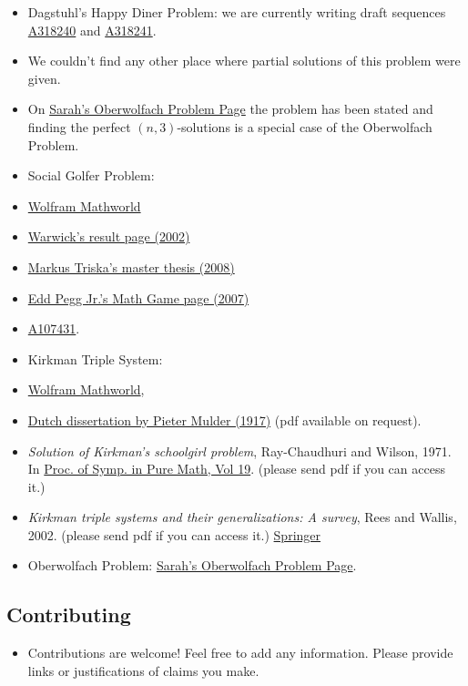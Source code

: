 \documentclass[a4paper]{article}
\begin{document}
\begin{itemize}

\item
  Dagstuhl's Happy Diner Problem: we are currently writing draft
  sequences \href{https://oeis.org/draft/A318240}{A318240} and
  \href{https://oeis.org/draft/A318241}{A318241}.
\item
  We couldn't find any other place where partial solutions of this
  problem were given.
\item
  On
  \href{http://facultyweb.kennesaw.edu/shollid4/oberwolfach.php}{Sarah's
  Oberwolfach Problem Page} the problem has been stated and finding the
  perfect $(n,3)$-solutions is a special case of the Oberwolfach
  Problem.
\item
  Social Golfer Problem:
\item
  \href{http://mathworld.wolfram.com/SocialGolferProblem.html}{Wolfram
  Mathworld}
\item
  \href{http://web.archive.org/web/20050308115423/http://www.icparc.ic.ac.uk/~wh/golf/}{Warwick's
  result page (2002)}
\item
  \href{https://www.metalevel.at/sgp/}{Markus Triska's master thesis
  (2008)}
\item
  \href{http://www.mathpuzzle.com/MAA/54-Golf\%20Tournaments/mathgames_08_14_07.html}{Edd
  Pegg Jr.'s Math Game page (2007)}
\item
  \href{https://oeis.org/A107431}{A107431}.
\item
  Kirkman Triple System:
\item
  \href{http://mathworld.wolfram.com/KirkmanTripleSystem.html}{Wolfram
  Mathworld},
\item
  \href{https://babel.hathitrust.org/cgi/pt?id=njp.32101065911230;view=1up;seq=19}{Dutch
  dissertation by Pieter Mulder (1917)} (pdf available on request).
\item
  \emph{Solution of Kirkman's schoolgirl problem}, Ray-Chaudhuri and
  Wilson, 1971. In \href{http://www.ams.org/books/pspum/019/}{Proc. of
  Symp. in Pure Math, Vol 19}. (please send pdf if you can access it.)
\item
  \emph{Kirkman triple systems and their generalizations: A survey},
  Rees and Wallis, 2002. (please send pdf if you can access it.)
  \href{https://link.springer.com/chapter/10.1007/978-1-4613-0245-2_13}{Springer}
\item
  Oberwolfach Problem:
  \href{http://facultyweb.kennesaw.edu/shollid4/oberwolfach.php}{Sarah's
  Oberwolfach Problem Page}.
\end{itemize}

\subsection{Contributing}\label{contributing}

\begin{itemize}

\item
  Contributions are welcome! Feel free to add any information. Please
  provide links or justifications of claims you make.
\end{itemize}
\end{document}
